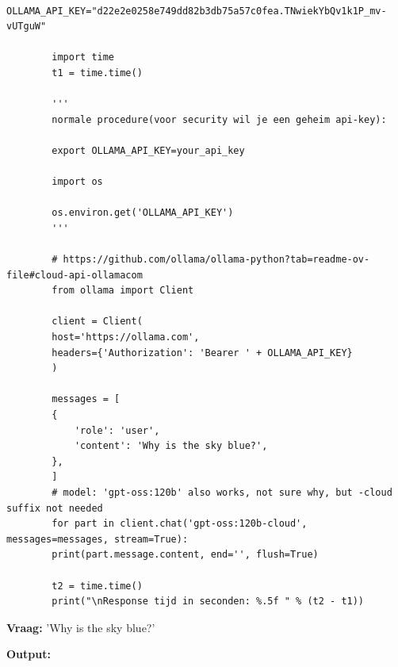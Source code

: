 \begin{listing}
    \begin{verbatim}
        OLLAMA_API_KEY="d22e2e0258e749dd82b3db75a57c0fea.TNwiekYbQv1k1P_mv-vUTguW"
        
        import time
        t1 = time.time()
        
        '''
        normale procedure(voor security wil je een geheim api-key):
        
        export OLLAMA_API_KEY=your_api_key
        
        import os
        
        os.environ.get('OLLAMA_API_KEY')
        '''
        
        # https://github.com/ollama/ollama-python?tab=readme-ov-file#cloud-api-ollamacom
        from ollama import Client
        
        client = Client(
        host='https://ollama.com',
        headers={'Authorization': 'Bearer ' + OLLAMA_API_KEY}
        )
        
        messages = [
        {
            'role': 'user',
            'content': 'Why is the sky blue?',
        },
        ]
        # model: 'gpt-oss:120b' also works, not sure why, but -cloud suffix not needed
        for part in client.chat('gpt-oss:120b-cloud', messages=messages, stream=True):
        print(part.message.content, end='', flush=True)
        
        t2 = time.time()
        print("\nResponse tijd in seconden: %.5f " % (t2 - t1))
    \end{verbatim}
    \caption[Ollama Cloud API Code]{Code om te communiceren met \textit{gpt-oss:120b-cloud}.}
    \label{lst:ollama-cloud-api-test}
\end{listing}

\textbf{Vraag:} 'Why is the sky blue?'

\textbf{Output:}

